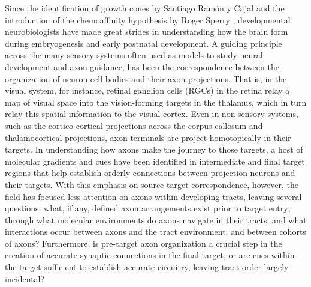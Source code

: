 Since the identification of growth cones by Santiago Ram\'on y Cajal and the introduction of the chemoaffinity hypothesis by Roger Sperry \cite{sperry1963chemoaffinity}, developmental neurobiologists have made great strides in understanding how the brain form during embryogenesis and early postnatal development.
A guiding principle across the many sensory systems often used as models to study neural development and axon guidance, has been the correspondence between the organization of neuron cell bodies and their axon projections.
That is, in the visual system, for instance, retinal ganglion cells (RGCs) in the retina relay a map of visual space into the vision-forming targets in the thalamus, which in turn relay this spatial information to the visual cortex.
Even in non-sensory systems, such as the cortico-cortical projections across the corpus callosum and thalamocortical projections, axon terminals are project homotopically in their targets. %
In understanding how axons make the journey to those targets, a host of molecular gradients and cues have been identified in intermediate and final target regions that help establish orderly connections between projection neurons and their targets.
With this emphasis on source-target correspondence, however, the field has focused less attention on axons within developing tracts, leaving several questions: what, if any, defined axon arrangements exist prior to target entry; through what molecular environments do axons navigate in their tracts; and what interactions occur between axons and the tract environment, and between cohorts of axons?
Furthermore, is pre-target axon organization a crucial step in the creation of accurate synaptic connections in the final target, or are cues within the target sufficient to establish accurate circuitry, leaving tract order largely incidental?

